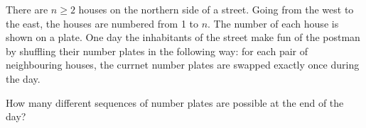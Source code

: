 There are $n \ge 2$ houses on the northern side of a street. Going from the west to the east, the houses are numbered from 1 to $n$. The number of each house is shown on a plate. One day the inhabitants of the street make fun of the postman by shuffling their number plates in the following way: for each pair of neighbouring houses, the currnet number plates are swapped exactly once during the day.

How many different sequences of number plates are possible at the end of the day?